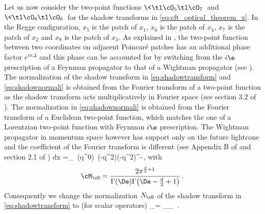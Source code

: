 Let us now consider the two-point functions $\<\tl \cO_5 \tl \cO_7\>$ and $\<\tl \cO_8 \tl \cO_6\>$ for the shadow transforms in \eqref{eq:cft_optical_theorem_x}.
In the Regge configuration, $x_5$ is the patch of $x_1$, $x_6$ is the patch of $x_4$, $x_7$ is the patch of $x_2$ and $x_8$ is the patch of $x_3$.
As explained in \cite{Cornalba:2007zb,Kravchuk:2018htv}, the two-point function between two coordinates on adjacent Poincar\'e patches has an additional phase factor $e^{i \pi \Delta}$ and this phase can be accounted for by switching from the $i\e$ prescription of a Feynman propagator to that of a Wightman propagator (see \cite{Cornalba:2007zb}).
The normalization of the shadow transform in \eqref{eq:shadowtransform} and \eqref{eq:shadownormali} is obtained from the Fourier transform of a two-point function as the shadow transform acts multiplicatively in Fourier space (see section 3.2 of \cite{Karateev:2018oml}). The normalization in \eqref{eq:shadownormali} is obtained from the Fourier transform of a Euclidean two-point function, which matches the one of a Lorentzian two-point function with Feynman $i\e$ prescription. The Wightman propagator in momentum space however has support only on the future lightcone and the coefficient of the Fourier transform is different (see Appendix B of \cite{Cornalba:2007zb} and 
section 2.1 of \cite{Gillioz:2018mto})
\bea
\int dx  =\cM_{\cO} 
 \,\Theta(q^{0}) \,\Theta(-q^{2})\left(-q^{2}\right)^{\De-}\,,
with 
\begin{equation}
 \cM_{\cO}  = \frac{2\pi^{\frac{d}{2}+1}}{\Gamma(\De)\Gamma\big(\De - \frac{d}{2} + 1\big)} \,.
\end{equation}
Consequently we change the normalization $N_\cO$ of the shadow transform in \eqref{eq:shadowtransform} to (for scalar operators)
\be
{}_\cO = \cM_\cO \cM_{\tl \cO}  \,. 
\label{eq:new_normali}
\ee

